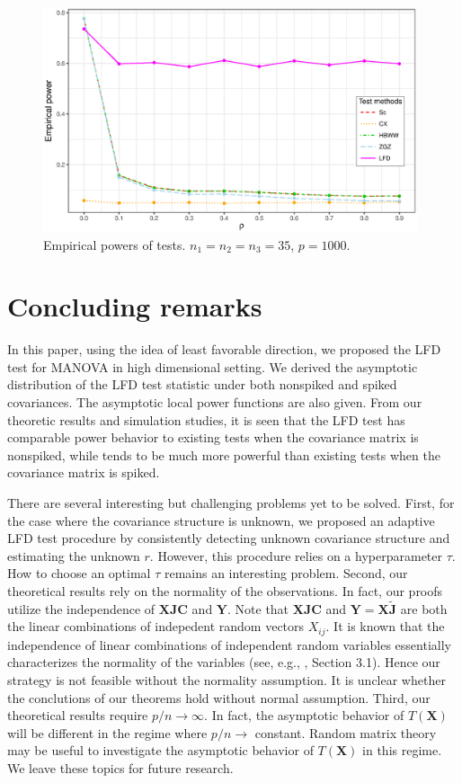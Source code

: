 \documentclass[12pt]{article} %
\newcommand{\bX}{\mathbf{X}}
\newcommand{\bY}{\mathbf{Y}}
\newcommand{\bJ}{\mathbf{J}}
\newcommand{\bC}{\mathbf{C}}
\theoremstyle{definition}
\begin{document}
\begin{figure}[htbp]
    \centering
    \includegraphics[width=0.98\textwidth]{figure1}
    \caption{Empirical powers of tests. $n_1=n_2=n_3=35$, $p=1000$.}
    \label{figure1}
\end{figure}





\section{Concluding remarks}\label{concluding}
\setcounter{equation}{0} %
In this paper, using the idea of least favorable direction, we proposed the LFD test for MANOVA in high dimensional setting.
We derived the asymptotic distribution of the LFD test statistic under both nonspiked and spiked covariances.
The asymptotic local power functions are also given.
From our theoretic results and simulation studies, it is seen that the LFD test has comparable power behavior to existing tests when the covariance matrix is nonspiked, while tends to be much more powerful than existing tests when the covariance matrix is spiked.

There are several interesting but challenging problems yet to be solved.
First, for the case where the covariance structure is unknown,
we proposed an adaptive LFD test procedure by consistently detecting unknown covariance structure and estimating the unknown $r$.
However, this procedure relies on a hyperparameter $\tau$. 
How to choose an optimal $\tau$ remains an interesting problem.
Second, our theoretical results rely on the normality of the observations.
In fact, our proofs utilize the independence of $\bX \bJ \bC$ and $\bY$.
Note that $\bX \bJ \bC$ and $\bY =\bX \tilde{\bJ}$ are both the linear combinations of indepedent random vectors $X_{ij}$.
It is known that the independence of linear combinations of independent random variables essentially characterizes the normality of the variables (see, e.g., \cite{KAGAN}, Section 3.1).
Hence our strategy is not feasible without the normality assumption.
It is unclear whether the conclutions of our theorems hold without normal assumption.
Third, our theoretical results require $p/n \to \infty$.
In fact, the asymptotic behavior of $T(\bX)$ will be different in the regime where $p/n \to$ constant.
Random matrix theory may be useful to investigate the asymptotic behavior of $T(\bX)$ in this regime.
We leave these topics for future research.
\end{document}
